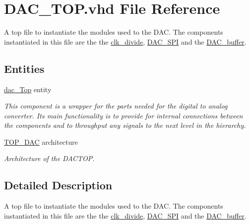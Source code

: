 \hypertarget{DAC__TOP_8vhd}{\section{D\-A\-C\-\_\-\-T\-O\-P.\-vhd File Reference}
\label{DAC__TOP_8vhd}
}


A top file to instantiate the modules used to the D\-A\-C. The components instantiated in this file are the the \hyperlink{classclk__divide}{clk\-\_\-divide}, \hyperlink{classDAC__SPI}{D\-A\-C\-\_\-\-S\-P\-I} and the \hyperlink{classDAC__buffer}{D\-A\-C\-\_\-buffer}.  


\subsection*{Entities}
\begin{DoxyCompactItemize}
\item 
\hyperlink{classdac__Top}{dac\-\_\-\-Top} entity
\begin{DoxyCompactList}\small\item\em This component is a wrapper for the parts needed for the digital to analog converter. Its main functionality is to provide for internal connections between the components and to throughput any signals to the next level in the hierarchy. \end{DoxyCompactList}\item 
\hyperlink{classdac__Top_1_1TOP__DAC}{T\-O\-P\-\_\-\-D\-A\-C} architecture
\begin{DoxyCompactList}\small\item\em Architecture of the D\-A\-C\-T\-O\-P. \end{DoxyCompactList}\end{DoxyCompactItemize}


\subsection{Detailed Description}
A top file to instantiate the modules used to the D\-A\-C. The components instantiated in this file are the the \hyperlink{classclk__divide}{clk\-\_\-divide}, \hyperlink{classDAC__SPI}{D\-A\-C\-\_\-\-S\-P\-I} and the \hyperlink{classDAC__buffer}{D\-A\-C\-\_\-buffer}. 